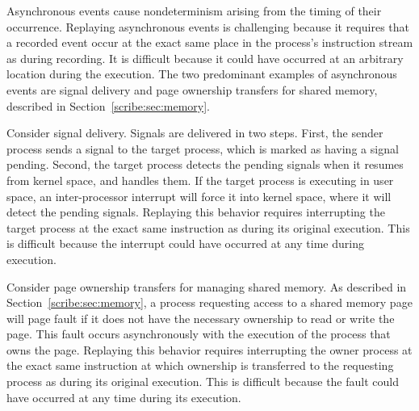 \begin{figure}[t]
\begin{center}
\begin{tabular}{llll|l}
  \end{tabular}
  \end{center}

  \vskip -1mm

  \label{scribe:fig:recasync}
\end{figure}

Asynchronous events cause nondeterminism arising from the timing of
their occurrence.  Replaying asynchronous events is challenging
because it requires that a recorded event occur at the exact same
place in the process's instruction stream as during recording. It is
difficult because it could have occurred at an arbitrary location
during the execution. The two predominant examples of asynchronous
events are signal delivery and page ownership transfers for shared
memory, described in Section~\ref{scribe:sec:memory}.

Consider signal delivery.  Signals are delivered in two steps.  First,
the sender process sends a signal to the target process, which is
marked as having a signal pending.  Second, the target process detects
the pending signals when it resumes from kernel space, and handles
them.  If the target process is executing in user space, an
inter-processor interrupt will force it into kernel space, where it 
will detect the pending signals.  Replaying this behavior requires
interrupting the target process at the exact same instruction as
during its original execution.  This is difficult because the
interrupt could have occurred at any time during execution.

Consider page ownership transfers for managing shared memory.  As
described in Section~\ref{scribe:sec:memory}, a process requesting access to
a shared memory page will page fault if it does not have the necessary
ownership to read or write the page.  This fault occurs asynchronously
with the execution of the process that owns the page.  Replaying this
behavior requires interrupting the owner process at the exact same
instruction at which ownership is transferred to the requesting
process as during its original execution.  This is difficult because
the fault could have occurred at any time during its execution.

